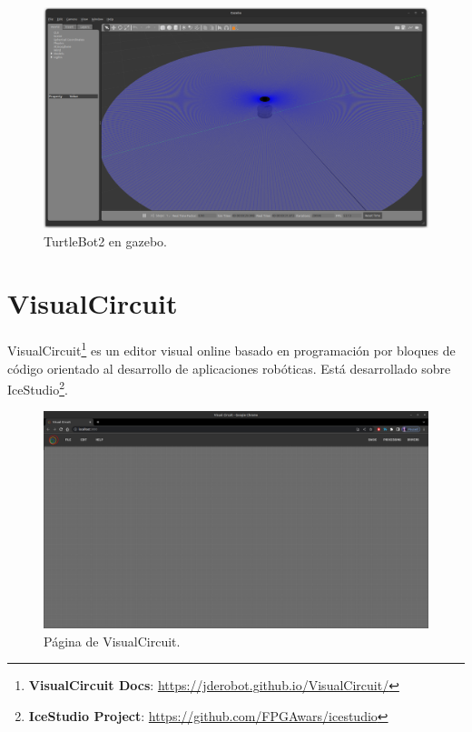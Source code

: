 \begin{figure} [H]
    \begin{center}
        \includegraphics[width=14cm]{figs/c3/turtlebot2_sim.png}
    \end{center}
    \caption[TurtleBot2 simulado]{TurtleBot2 en gazebo.}
    \label{fig:turtlebot_2_sim}
\end{figure}
 

\section{VisualCircuit}
\label{sec:visualcircuit}

VisualCircuit\footnote{\textbf{VisualCircuit Docs}: \url{https://jderobot.github.io/VisualCircuit/}} es un editor visual online basado en
programación por bloques de código orientado al desarrollo de aplicaciones robóticas. Está desarrollado sobre
IceStudio\footnote{\textbf{IceStudio Project}: \url{https://github.com/FPGAwars/icestudio}}.\\

\begin{figure} [H]
    \begin{center}
        \includegraphics[width=13cm]{figs/c3/empty_VC.png}
    \end{center}
    \caption[VisualCircuit]{Página de VisualCircuit.}
    \label{fig:VC_empty}
\end{figure}

